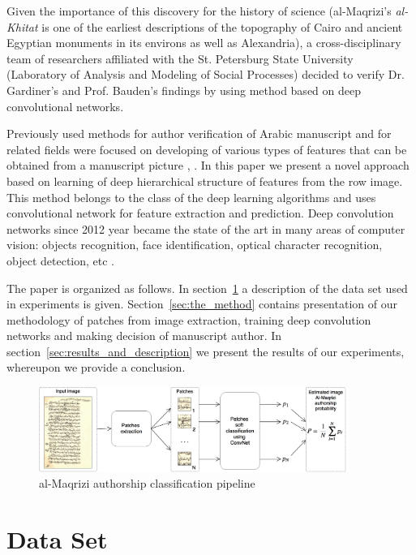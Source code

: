 \documentclass[conference,a4paper,twocolumn]{IEEEtran}
\begin{document}
Given the importance of this discovery for the history of science (al-Maqrizi's \textit{al-Khitat} is one of the earliest descriptions of the topography of Cairo and ancient Egyptian monuments in its environs as well as Alexandria), a cross-disciplinary team of researchers affiliated with the St. Petersburg State University (Laboratory of Analysis and Modeling of Social Processes) decided to verify Dr. Gardiner's and Prof. Bauden's findings by using method based on deep convolutional networks.

Previously used methods for author verification of Arabic manuscript and for related fields were focused on developing of various types of features that can be obtained from a manuscript picture \cite{MBulacu}, \cite{DFecker}. In this paper we present a novel approach based on learning of deep hierarchical structure of features from the row image. This method belongs to the class of the deep learning algorithms \cite{DL} and uses convolutional network \cite{CNN} for feature extraction and prediction. Deep convolution networks since 2012 year \cite{Alexnet} became the state of the art in many areas of computer vision: objects recognition, face identification, optical character recognition, object detection, etc \cite{DL}.

The paper is organized as follows. In section~\ref{sec:the_data} a description of the data set used in experiments is given. Section~\ref{sec:the_method} contains presentation of our methodology of patches from image extraction, training deep convolution networks and making decision of manuscript author. In section~\ref{sec:results_and_description} we present the results of our experiments, whereupon we provide a conclusion.
	

\begin{figure}[!t]
	\center
  \includegraphics[width=0.9\textwidth]{figures/Al-Maqrizi_classification_pipeline.png}
  \caption{al-Maqrizi authorship classification pipeline}
  \label{fig:pipeline}
\end{figure}	
	
\section{Data Set}
\label{sec:the_data}
\end{document}
